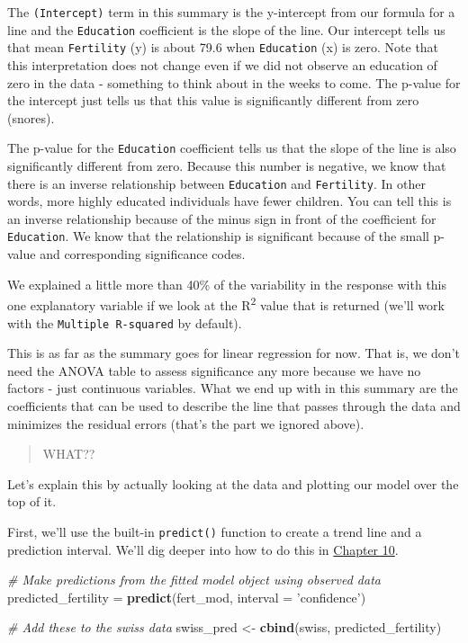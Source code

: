 \documentclass[
]{book}
\newenvironment{Shaded}{\begin{snugshade}}{\end{snugshade}}
\newcommand{\CommentTok}[1]{\textcolor[rgb]{0.56,0.35,0.01}{\textit{#1}}}
\newcommand{\DataTypeTok}[1]{\textcolor[rgb]{0.13,0.29,0.53}{#1}}
\newcommand{\KeywordTok}[1]{\textcolor[rgb]{0.13,0.29,0.53}{\textbf{#1}}}
\newcommand{\NormalTok}[1]{#1}
\newcommand{\StringTok}[1]{\textcolor[rgb]{0.31,0.60,0.02}{#1}}
\begin{document}
The \texttt{(Intercept)} term in this summary is the y-intercept from our formula for a line and the \texttt{Education} coefficient is the slope of the line. Our intercept tells us that mean \texttt{Fertility} (y) is about 79.6 when \texttt{Education} (x) is zero. Note that this interpretation does not change even if we did not observe an education of zero in the data - something to think about in the weeks to come. The p-value for the intercept just tells us that this value is significantly different from zero (snores).

The p-value for the \texttt{Education} coefficient tells us that the slope of the line is also significantly different from zero. Because this number is negative, we know that there is an inverse relationship between \texttt{Education} and \texttt{Fertility}. In other words, more highly educated individuals have fewer children. You can tell this is an inverse relationship because of the minus sign in front of the coefficient for \texttt{Education}. We know that the relationship is significant because of the small p-value and corresponding significance codes.

We explained a little more than 40\% of the variability in the response with this one explanatory variable if we look at the R\textsuperscript{2} value that is returned (we'll work with the \texttt{Multiple\ R-squared} by default).

This is as far as the summary goes for linear regression for now. That is, we don't need the ANOVA table to assess significance any more because we have no factors - just continuous variables. What we end up with in this summary are the coefficients that can be used to describe the line that passes through the data and minimizes the residual errors (that's the part we ignored above).

\begin{quote}
WHAT??
\end{quote}

Let's explain this by actually looking at the data and plotting our model over the top of it.

First, we'll use the built-in \texttt{predict()} function to create a trend line and a prediction interval. We'll dig deeper into how to do this in \protect\hyperlink{Chapter10}{Chapter 10}.

\begin{Shaded}
\begin{Highlighting}[]
\CommentTok{# Make predictions from the fitted model object using observed data}
\NormalTok{predicted_fertility =}\StringTok{ }\KeywordTok{predict}\NormalTok{(fert_mod, }\DataTypeTok{interval =} \StringTok{'confidence'}\NormalTok{)}

\CommentTok{# Add these to the swiss data}
\NormalTok{swiss_pred <-}\StringTok{ }\KeywordTok{cbind}\NormalTok{(swiss, predicted_fertility)}
\end{Highlighting}
\end{Shaded}
\end{document}

